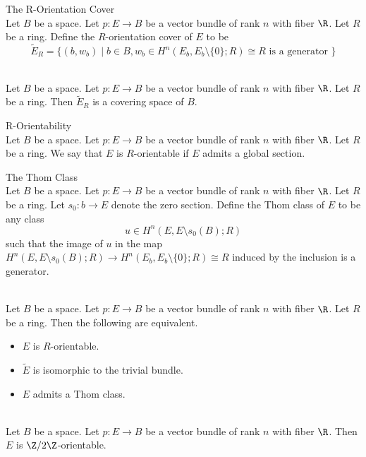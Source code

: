\documentclass[a4paper]{article}
\begin{document}
\begin{defn}{The R-Orientation Cover}{}\\
Let $B$ be a space. Let $p:E\to B$ be a vector bundle of rank $n$ with fiber $\R$. Let $R$ be a ring. Define the $R$-orientation cover of $E$ to be $$\widetilde{E}_R=\{(b,w_b)\;|\;b\in B, w_b\in H^n(E_b,E_b\setminus\{0\};R)\cong R\text{ is a generator }\}$$
\end{defn}

\begin{lmm}{}{}\\
Let $B$ be a space. Let $p:E\to B$ be a vector bundle of rank $n$ with fiber $\R$. Let $R$ be a ring. Then $\widetilde{E}_R$ is a covering space of $B$. 
\end{lmm}

\begin{defn}{R-Orientability}{}\\
Let $B$ be a space. Let $p:E\to B$ be a vector bundle of rank $n$ with fiber $\R$. Let $R$ be a ring. We say that $E$ is $R$-orientable if $E$ admits a global section. 
\end{defn}

\begin{defn}{The Thom Class}{}\\
Let $B$ be a space. Let $p:E\to B$ be a vector bundle of rank $n$ with fiber $\R$. Let $R$ be a ring. Let $s_0:b\to E$ denote the zero section. Define the Thom class of $E$ to be any class $$u\in H^n(E,E\setminus s_0(B);R)$$ such that the image of $u$ in the map $H^n(E,E\setminus s_0(B);R)\to H^n(E_b,E_b\setminus\{0\};R)\cong R$ induced by the inclusion is a generator. 
\end{defn}

\begin{lmm}{}{}\\
Let $B$ be a space. Let $p:E\to B$ be a vector bundle of rank $n$ with fiber $\R$. Let $R$ be a ring. Then the following are equivalent. 
\begin{itemize}
\item $E$ is $R$-orientable. 
\item $\widetilde{E}$ is isomorphic to the trivial bundle. 
\item $E$ admits a Thom class. 
\end{itemize}
\end{lmm}

\begin{crl}{}{}\\
Let $B$ be a space. Let $p:E\to B$ be a vector bundle of rank $n$ with fiber $\R$. Then $E$ is $\Z/2\Z$-orientable. 
\end{crl}
\end{document}
